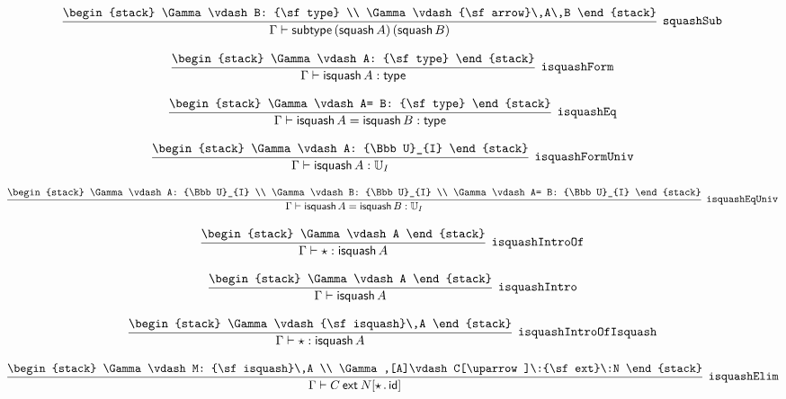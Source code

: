 \[
\infer[{\tt squashSub}]{\Gamma \vdash {\sf subtype}\,({\sf squash}\,A)\,({\sf squash}\,B)}{
\begin{stack}
\Gamma \vdash B: {\sf type}
\\
\Gamma \vdash {\sf arrow}\,A\,B
\end{stack}}
\]

\[
\infer[{\tt isquashForm}]{\Gamma \vdash {\sf isquash}\,A: {\sf type}}{
\begin{stack}
\Gamma \vdash A: {\sf type}
\end{stack}}
\]

\[
\infer[{\tt isquashEq}]{\Gamma \vdash {\sf isquash}\,A= {\sf isquash}\,B: {\sf type}}{
\begin{stack}
\Gamma \vdash A= B: {\sf type}
\end{stack}}
\]

\[
\infer[{\tt isquashFormUniv}]{\Gamma \vdash {\sf isquash}\,A: {\Bbb U}_{I}}{
\begin{stack}
\Gamma \vdash A: {\Bbb U}_{I}
\end{stack}}
\]

\[
\infer[{\tt isquashEqUniv}]{\Gamma \vdash {\sf isquash}\,A= {\sf isquash}\,B: {\Bbb U}_{I}}{
\begin{stack}
\Gamma \vdash A: {\Bbb U}_{I}
\\
\Gamma \vdash B: {\Bbb U}_{I}
\\
\Gamma \vdash A= B: {\Bbb U}_{I}
\end{stack}}
\]

\[
\infer[{\tt isquashIntroOf}]{\Gamma \vdash \star : {\sf isquash}\,A}{
\begin{stack}
\Gamma \vdash A
\end{stack}}
\]

\[
\infer[{\tt isquashIntro}]{\Gamma \vdash {\sf isquash}\,A}{
\begin{stack}
\Gamma \vdash A
\end{stack}}
\]

\[
\infer[{\tt isquashIntroOfIsquash}]{\Gamma \vdash \star : {\sf isquash}\,A}{
\begin{stack}
\Gamma \vdash {\sf isquash}\,A
\end{stack}}
\]

\[
\infer[{\tt isquashElim}]{\Gamma \vdash C\:{\sf ext}\:N[\star \,.\,{\sf id}]}{
\begin{stack}
\Gamma \vdash M: {\sf isquash}\,A
\\
\Gamma ,[A]\vdash C[\uparrow ]\:{\sf ext}\:N
\end{stack}}
\]


